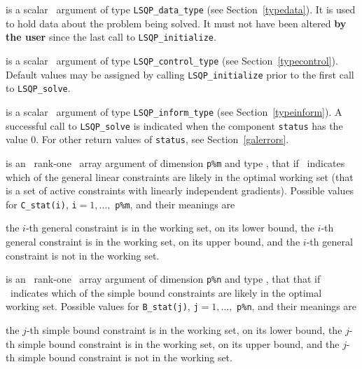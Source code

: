 \documentclass{galahad}
\newcommand{\packagename}{LSQP}
\begin{document}
\begin{description}
 is a scalar \intentinout\ argument of type 
{\tt \packagename\_data\_type}
(see Section~\ref{typedata}). It is used to hold data about the problem being 
solved. It must not have been altered {\bf by the user} since the last call to 
{\tt \packagename\_initialize}.

 is a scalar \intentin\ argument of type 
{\tt \packagename\_control\_type}
(see Section~\ref{typecontrol}). Default values may be assigned by calling 
{\tt \packagename\_initialize} prior to the first call to 
{\tt \packagename\_solve}.

 is a scalar \intentinout\ argument of type 
{\tt \packagename\_inform\_type}
(see Section~\ref{typeinform}). A successful call to
{\tt \packagename\_solve}
is indicated when the  component {\tt status} has the value 0. 
For other return values of {\tt status}, see Section~\ref{galerrors}.

 is an \optional\ rank-one \intentout\ array argument 
of dimension {\tt p\%m}
and type \integer, that if \present\
indicates which of the general linear
constraints are likely in the optimal working set (that is a set of active
constraints with linearly independent gradients). Possible values for 
{\tt C\_stat(i)}, {\tt i}$=1, \ldots ,$ {\tt p\%m}, and their meanings are
\begin{description}
 the $i$-th general constraint 
is in the working set, on its lower bound,
 the $i$-th general constraint 
is in the working set, on its upper bound, and
  the $i$-th general constraint is not in the working set.
\end{description}

 is an \optional\ rank-one \intentout\ array argument 
of dimension {\tt p\%n}
and type \integer, that that if \present\
indicates which of the simple bound 
constraints are likely in the optimal working set. Possible values for 
{\tt B\_stat(j)}, {\tt j}$=1, \ldots ,$ {\tt p\%n}, and their meanings are
\begin{description}
\itt{<0} the $j$-th simple bound constraint 
is in the working set, on its lower bound,
\itt{>0} the $j$-th simple bound constraint 
is in the working set, on its upper bound, and
\itt{0}  the $j$-th simple bound constraint is not in the working set.
\end{description}


\end{description}
\end{document}
